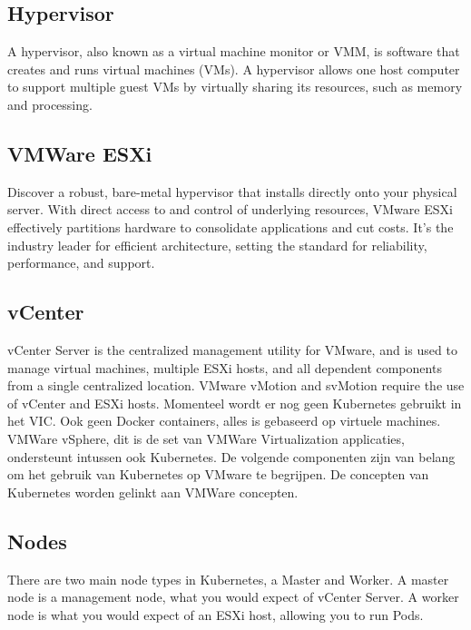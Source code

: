 \subsection{Hypervisor}
A hypervisor, also known as a virtual machine monitor or VMM, is software that creates and runs virtual machines (VMs). A hypervisor allows one host computer to support multiple guest VMs by virtually sharing its resources, such as memory and processing.\autocite{VMware2023a}

\subsection{VMWare ESXi}
Discover a robust, bare-metal hypervisor that installs directly onto your physical server. With direct access to and control of underlying resources, VMware ESXi effectively partitions hardware to consolidate applications and cut costs. It’s the industry leader for efficient architecture, setting the standard for reliability, performance, and support.\autocite{VMware2023}

\subsection{vCenter}
vCenter Server is the centralized management utility for VMware, and is used to manage virtual machines, multiple ESXi hosts, and all dependent components from a single centralized location. VMware vMotion and svMotion require the use of vCenter and ESXi hosts.\autocite{Abbas2023}
\newline
\newline
Momenteel wordt er nog geen Kubernetes gebruikt in het VIC. Ook geen Docker containers, alles is gebaseerd op virtuele machines.
\newline
\newline
VMWare vSphere, dit is de set van VMWare Virtualization applicaties, ondersteunt intussen ook Kubernetes.
\newline
\newline
De volgende componenten zijn van belang om het gebruik van Kubernetes op VMware te begrijpen. De concepten van Kubernetes worden gelinkt aan VMWare concepten.

\subsection{Nodes}
There are two main node types in Kubernetes, a Master and Worker. A master node is a management node, what you would expect of vCenter Server. A worker node is what you would expect of an ESXi host, allowing you to run Pods.\autocite{VMware2019}

